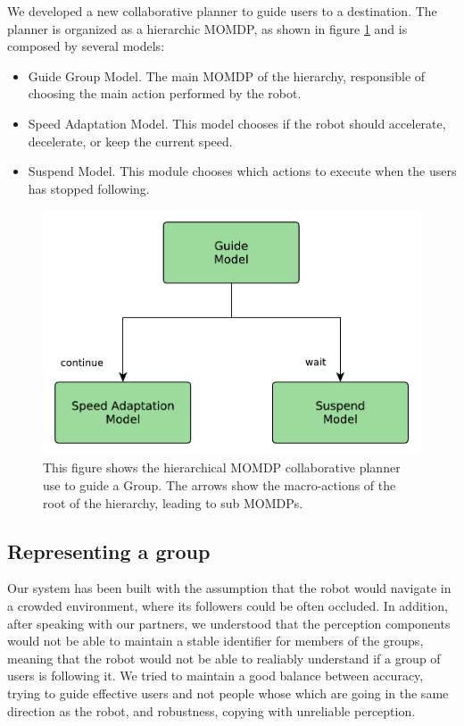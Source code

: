 We developed a new collaborative planner to guide users to a destination. The planner is organized as a hierarchic MOMDP, as shown in figure \ref{fig:case_study-spencer-guide_planner} and is composed by several models:
\begin{itemize}
\item Guide Group Model. The main MOMDP of the hierarchy, responsible of choosing the main action performed by the robot.
\item Speed Adaptation Model. This model chooses if the robot should accelerate, decelerate, or keep the current speed.
\item Suspend Model. This module chooses which actions to execute when the users has stopped following.
\end{itemize}



\begin{figure}[ht!]
	\centering
	\includegraphics[scale=0.45]{img/case_study/spencer/guide_planner.pdf}
	\caption[Collaborative planner for guiding]{This figure shows the hierarchical MOMDP collaborative planner use to guide a Group. The arrows show the macro-actions of the root of the hierarchy, leading to sub MOMDPs.}
	\label{fig:case_study-spencer-guide_planner}
\end{figure}

\subsection{Representing a group}
Our system has been built with the assumption that the robot would navigate in a crowded environment, where its followers could be often occluded. In addition, after speaking with our partners, we understood that the perception components would not be able to maintain a stable identifier for members of the groups, meaning that the robot would not be able to realiably understand if a group of users is following it. We tried to maintain a good balance between accuracy, trying to guide effective users and not people whose which are going in the same direction as the robot, and robustness, copying with unreliable perception.

